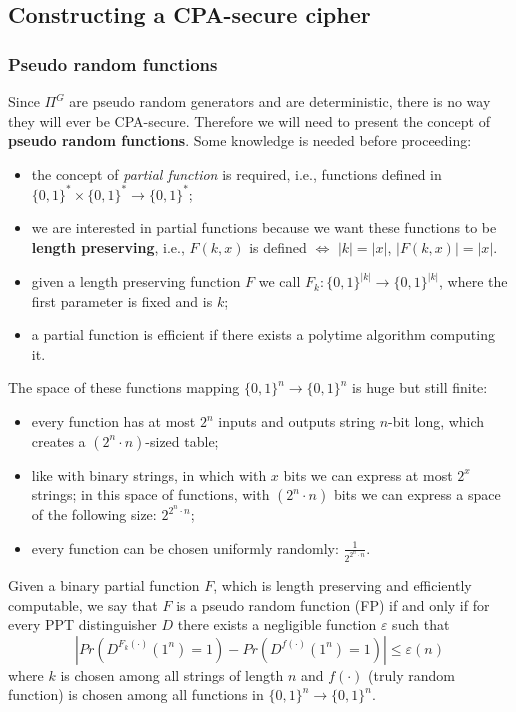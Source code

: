 \documentclass[../main]{subfiles}
\begin{document}
\subsection{Constructing a CPA-secure cipher}

\subsubsection{Pseudo random functions}
Since $\Pi^G$ are pseudo random generators and are deterministic, there is no way they will ever be CPA-secure.
Therefore we will need to present the concept of \textbf{pseudo random functions}.
Some knowledge is needed before proceeding:
\begin{itemize}
    \item the concept of \textit{partial function} is required, i.e., functions defined in $\{0,1\}^*\times\{0,1\}^*\rightarrow\{0,1\}^*$;
    \item we are interested in partial functions because we want these functions to be \textbf{length preserving}, i.e., $F(k,x)$ is defined $\Leftrightarrow$ $|k| = |x|$, $|F(k,x)| = |x|$.
    \item given a length preserving function $F$ we call $F_k: \{0,1\}^{|k|} \rightarrow{} \{0,1\}^{|k|}$, where the first parameter is fixed and is $k$;
    \item a partial function is efficient if there exists a polytime algorithm computing it.
\end{itemize}
The space of these functions mapping $\{0,1\}^n \rightarrow{} \{0,1\}^n$ is huge but still finite:
\begin{itemize}
    \item every function has at most $2^n$ inputs and outputs string $n$-bit long, which creates a $(2^n \cdot{} n)$-sized table;
    \item like with binary strings, in which with $x$ bits we can express at most $2^x$ strings; in this space of functions, with $(2^n \cdot{} n)$ bits we can express a space of the following size: $2^{2^n \cdot{} n}$;
    \item every function can be chosen uniformly randomly: $\frac{1}{2^{2^n \cdot{} n}}$.
\end{itemize}

\begin{definition}
    Given a binary partial function $F$, which is length preserving and efficiently computable, 
    we say that $F$ is a pseudo random function (FP) if and only if for every PPT distinguisher $D$ 
    there exists a negligible function $\varepsilon$ such that
    $$|Pr(D^{F_k(\cdot)}(1^n)=1)-Pr(D^{f(\cdot)}(1^n)=1)|\le{}\varepsilon(n)$$
    where $k$ is chosen among all strings of length $n$ and $f(\cdot)$ (truly random function) is chosen among all functions in $\{0,1\}^n \rightarrow{} \{0,1\}^n$.
\end{definition}
\end{document}

